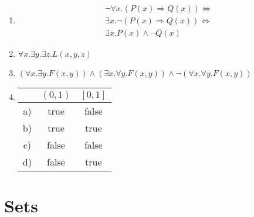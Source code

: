 \documentclass{article}
\begin{document}
\begin{enumerate}
    \item
        \begin{align*}
            \lnot \forall x.(P(x) \Rightarrow Q(x)) \Leftrightarrow \\
            \exists x.\lnot (P(x) \Rightarrow Q(x)) \Leftrightarrow \\
            \exists x. P(x) \land \lnot Q(x)
        \end{align*}
        
    \item
        $ \forall x . \exists y . \exists z . L(x,y,z)$

    \item
        $(\forall x . \exists y . F(x,y)) \land (\exists x . \forall y . F(x,y)) \land \lnot (\forall x. \forall y . F(x,y))$

    \item
        \begin{tabular}{c | c | c}
             & $ (0,1) $ & $ [0,1] $ \\ \hline
            a) & true & false \\
            b) & true & true \\
            c) & false & false \\
            d) & false & true
        \end{tabular}
\end{enumerate}

\section{Sets}
\end{document}
